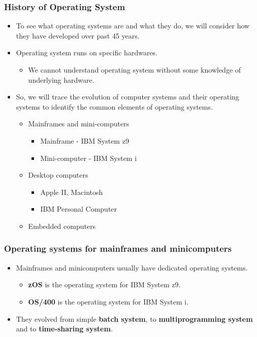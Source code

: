 \documentclass[CJKutf8,xcolor=pdftex,dvipsnames,table]{beamer}
\begin{document}
\begin{CJK*}{UTF8}{song}
  \begin{frame}
    \frametitle{History of Operating System} \pause
	  \begin{itemize}
	  \item{To see what operating systems are and what they do, we will consider how they have developed over past 45 years.} \pause
	  \item{Operating system runs on specific hardwares.} \pause
	    \begin{itemize}
	    \item{We cannot understand operating system without some knowledge of underlying hardware.} \pause
	    \end{itemize}
	  \item{So, we will trace the evolution of computer systems and their operating systems to identify the common elements of operating systems.} \pause
	    \begin{itemize}
	    \item{Mainframes and mini-computers} \pause
	      \begin{itemize}
	      \item{Mainframe - IBM System z9} \pause
	      \item{Mini-computer - IBM System i} \pause
	      \end{itemize}
	    \item{Desktop computers} \pause
	      \begin{itemize}
	      \item{Apple II, Macintosh} \pause
	      \item{IBM Personal Computer} \pause
	      \end{itemize}
	    \item{Embedded computers}
	    \end{itemize}
	  \end{itemize}
  \end{frame}

  \begin{frame}
    \frametitle{Operating systems for mainframes and minicomputers} \pause
	  \begin{itemize}
	  \item{Mainframes and minicomputers usually have dedicated operating systems.} \pause
	    \begin{itemize}
	    \item{\textbf{zOS} is the operating system for IBM System z9.} \pause
	    \item{\textbf{OS/400} is the operating system for IBM System i.} \pause
	    \end{itemize}
	  \item{They evolved from simple \textbf{batch system}, to \textbf{multiprogramming system} and to \textbf{time-sharing system}.}
	  \end{itemize}
  \end{frame}


\end{CJK*}
\end{document}
